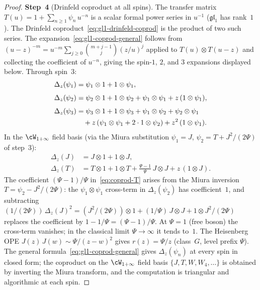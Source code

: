 \begin{proof}
\medskip
\noindent
\textbf{Step~4}
(Drinfeld coproduct at all spins).
The transfer matrix
$T(u) = 1 + \sum_{n \geq 1} \psi_n\, u^{-n}$
is a scalar formal power series in $u^{-1}$
($\mathfrak{gl}_1$ has rank~$1$). The Drinfeld
coproduct~\eqref{eq:gl1-drinfeld-coprod} is the product
of two such series. The
expansion~\eqref{eq:gl1-coprod-general} follows from
$(u - z)^{-m} = u^{-m} \sum_{j \geq 0}
\binom{m+j-1}{j} (z/u)^j$ applied to
$T(u) \otimes T(u-z)$ and collecting the coefficient
of $u^{-n}$, giving the spin-$1$, $2$, and $3$ expansions
displayed below.
Through spin~$3$:
\begin{align}
 \Delta_z(\psi_1)
 &= \psi_1 \otimes 1
 + 1 \otimes \psi_1,
 \label{eq:coprod-psi1} \\[4pt]
 \Delta_z(\psi_2)
 &= \psi_2 \otimes 1
 + 1 \otimes \psi_2
 + \psi_1 \otimes \psi_1
 + z\,(1 \otimes \psi_1),
 \label{eq:coprod-psi2} \\[4pt]
 \Delta_z(\psi_3)
 &= \psi_3 \otimes 1
 + 1 \otimes \psi_3
 + \psi_1 \otimes \psi_2
 + \psi_2 \otimes \psi_1
 \notag \\
 &\quad
 + z\,(\psi_1 \otimes \psi_1
 + 2 \cdot 1 \otimes \psi_2)
 + z^2\,(1 \otimes \psi_1).
 \label{eq:coprod-psi3}
\end{align}
In the $\cW_{1+\infty}$ field basis (via the Miura
substitution $\psi_1 = J$,
$\psi_2 = T + J^2/(2\Psi)$ of step~3):
\begin{align}
 \Delta_z(J)
 &= J \otimes 1
 + 1 \otimes J,
 \label{eq:coprod-J} \\[4pt]
 \Delta_z(T)
 &= T \otimes 1
 + 1 \otimes T
 + \tfrac{\Psi - 1}{\Psi}\, J \otimes J
 + z\,(1 \otimes J).
 \label{eq:coprod-T}
\end{align}
The coefficient $(\Psi - 1)/\Psi$ in~\eqref{eq:coprod-T}
arises from the Miura inversion $T = \psi_2 - J^2/(2\Psi)$:
the $\psi_1 \otimes \psi_1$ cross-term in
$\Delta_z(\psi_2)$ has coefficient~$1$, and
subtracting $(1/(2\Psi))\,\Delta_z(J)^2
= (J^2/(2\Psi)) \otimes 1 + (1/\Psi)\,J \otimes J
+ 1 \otimes J^2/(2\Psi)$
replaces the coefficient by $1 - 1/\Psi = (\Psi - 1)/\Psi$.
At $\Psi = 1$ (free boson) the cross-term vanishes;
in the classical limit $\Psi \to \infty$ it tends to~$1$.
The Heisenberg OPE
$J(z)\,J(w) \sim \Psi/(z-w)^2$ gives
$r(z) = \Psi/z$ (class~$G$, level prefix $\Psi$).
The general formula~\eqref{eq:gl1-coprod-general} gives
$\Delta_z(\psi_n)$ at every spin in closed form; the
coproduct on the $\cW_{1+\infty}$ field basis
$\{J, T, W, W_4, \ldots\}$ is obtained by inverting
the Miura transform, and the computation is triangular
and algorithmic at each spin.


\end{proof}
